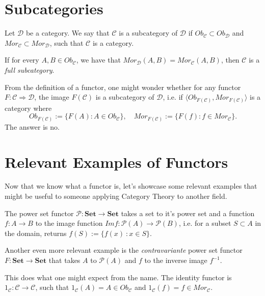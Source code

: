 \section{Subcategories}

\begin{definition}[Subcategory]
	Let $\mathcal D$ be a category. We say that $\mathcal C$
	is a subcategory of $\mathcal D$ if $Ob_\mathcal C \subset Ob_\mathcal D$ and
	$Mor_\mathcal C \subset Mor_\mathcal D$, such that $\mathcal C$ is a category.

	If for every $A, B \in Ob_\mathcal C$, we have that $Mor_\mathcal D (A,B) = Mor_\mathcal C(A,B)$,
	then $\mathcal C$ is a \textit{full subcategory}.
\end{definition}

From the definition of a functor, one might wonder whether for any
functor $F:\mathcal C \Rightarrow \mathcal D$,
the image $F(\mathcal C)$ is a subcategory of $\mathcal D$, i.e.
if $\langle Ob_{F(\mathcal C)}, Mor_{F(\mathcal C)} \rangle$ is a category where
\begin{displaymath}
	Ob_{F(\mathcal C)}:= \{F(A) : A \in Ob_\mathcal C\}, \quad
	Mor_{F(\mathcal C)}:= \{F(f) : f \in Mor_\mathcal C\}.
\end{displaymath}
The answer is no.

\section{Relevant Examples of Functors}

Now that we know what a functor is, let's showcase some relevant examples
that might be useful to someone applying Category Theory to another field.

\begin{example}
	The power set functor $\mathcal P : \mathbf{Set} \to \mathbf{Set}$ takes a
	set to it's power set and a function $f:A\to B$ to the image function
	$Im f : \mathcal P(A) \to \mathcal P(B)$, i.e. for a subset $S \subset A$
	in the domain, returns $f(S) := \{ f(x) \ : x \in S\}$.

	Another even more relevant example is the \textit{contravariante} power set
	functor $F : \mathbf{Set} \to \mathbf{Set}$ that takes $A$ to $\mathcal P(A)$
	and $f$ to the inverse image $f^{-1}$.
\end{example}

\begin{example}
	This does what one might expect from the name. The identity
	functor is $1_\mathcal C : \mathcal C \to \mathcal C$, such that
	$1_\mathcal C (A) = A \in Ob_\mathcal C$ and
	$1_\mathcal C (f) = f \in Mor_\mathcal C$.
\end{example}

